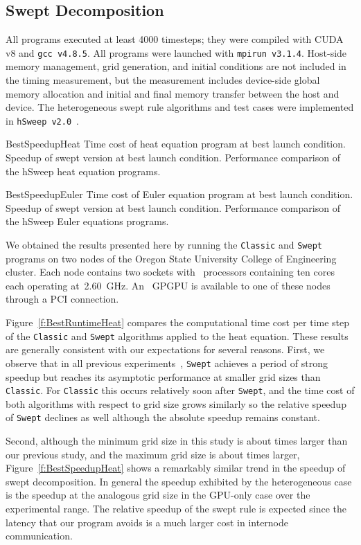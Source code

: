 
\subsection{Swept Decomposition}  \label{sec:SweptDecompRslt}

All programs executed at least \num{4000} timesteps; they were compiled with CUDA v8 and \texttt{gcc v4.8.5}.
All programs were launched with \texttt{mpirun v3.1.4}.
Host-side memory management, grid generation, and initial conditions are not included in the timing measurement, but the measurement includes device-side global memory allocation and initial and final memory transfer between the host and device.
The heterogeneous swept rule algorithms and test cases were implemented in \texttt{hSweep v2.0}~\cite{hSweepz}.

{BestSpeedupHeat}
{Time cost of heat equation program at best launch condition.}
{Speedup of swept version at best launch condition.}
{Performance comparison of the hSweep heat equation programs.}

{BestSpeedupEuler}
{Time cost of Euler equation program at best launch condition.}
{Speedup of swept version at best launch condition.}
{Performance comparison of the hSweep Euler equations programs.}

We obtained the results presented here by running the \texttt{Classic} and \texttt{Swept}
programs on two nodes of the Oregon State University College of Engineering cluster.
Each node contains two sockets with~\CCPU{} processors containing ten cores each operating at~\SI{2.60}{\giga\hertz}.
An~\CGPU{} GPGPU is available to one of these nodes through a PCI connection.

Figure~\ref{f:BestRuntimeHeat} compares the computational time cost per time step
of the \texttt{Classic} and \texttt{Swept} algorithms applied to the heat equation.
These results are generally consistent with our expectations for several reasons.
First, we observe that in all previous experiments~\cite{OurJCP, alhubail:16jcp},
\texttt{Swept} achieves a period of strong speedup but reaches its asymptotic performance
at smaller grid sizes than \texttt{Classic}.
For \texttt{Classic} this occurs relatively soon after \texttt{Swept}, and the time cost of both algorithms with respect to grid size grows similarly so the relative speedup of \texttt{Swept} declines as well although the absolute speedup remains constant.

Second, although the minimum grid size in this study is about  times larger
than our previous study, and the maximum grid size is about  times larger,
Figure~\ref{f:BestSpeedupHeat} shows a remarkably similar trend in the speedup of swept decomposition.
In general the speedup exhibited by the heterogeneous case is  the speedup at the analogous grid size in the GPU-only case over the experimental range.
The relative speedup of the swept rule is expected since the latency that our program avoids is a much larger cost in internode communication.


